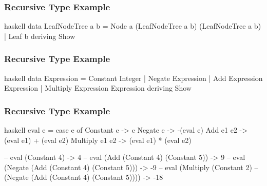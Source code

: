 \documentclass[dvipsnames]{beamer}
\theoremstyle{plain}
\begin{document}
\begin{frame}[fragile]
  \frametitle{Recursive Type Example}

  \begin{example}
    \begin{pygments}{haskell}
data LeafNodeTree a b =
    Node a (LeafNodeTree a b) (LeafNodeTree a b)
  | Leaf b
  deriving Show
    \end{pygments}
  \end{example}
\end{frame}

\begin{frame}[fragile]
  \frametitle{Recursive Type Example}

  \begin{example}
    \begin{pygments}{haskell}
data Expression = Constant Integer
                | Negate Expression
                | Add Expression Expression
                | Multiply Expression Expression
                deriving Show
    \end{pygments}
  \end{example}
\end{frame}

\begin{frame}[fragile]
  \frametitle{Recursive Type Example}

  \begin{example}
    \pause
    \begin{pygments}{haskell}
eval e =
    case e of
      Constant c -> c
      Negate e -> -(eval e)
      Add e1 e2 -> (eval e1) + (eval e2)
      Multiply e1 e2 -> (eval e1) * (eval e2)

-- eval (Constant 4) -> 4
-- eval (Add (Constant 4) (Constant 5)) -> 9
-- eval (Negate (Add (Constant 4) (Constant 5))) -> -9
-- eval (Multiply (Constant 2)
--         (Negate (Add (Constant 4) (Constant 5)))) -> -18
    \end{pygments}
  \end{example}
\end{frame}
% 
% 
% 
\end{document}
